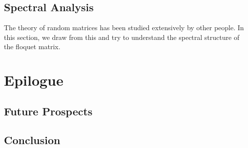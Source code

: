 \documentclass[twocolumn,nobalancelastpage]{report}
\begin{document}
\section{Spectral Analysis}
The theory of random matrices has been studied extensively by other people.
In this section, we draw from this and try to understand the spectral
structure of the floquet matrix. 

\chapter{Epilogue}
\section{Future Prospects}

\section{Conclusion}

\printbibliography
\end{document}
